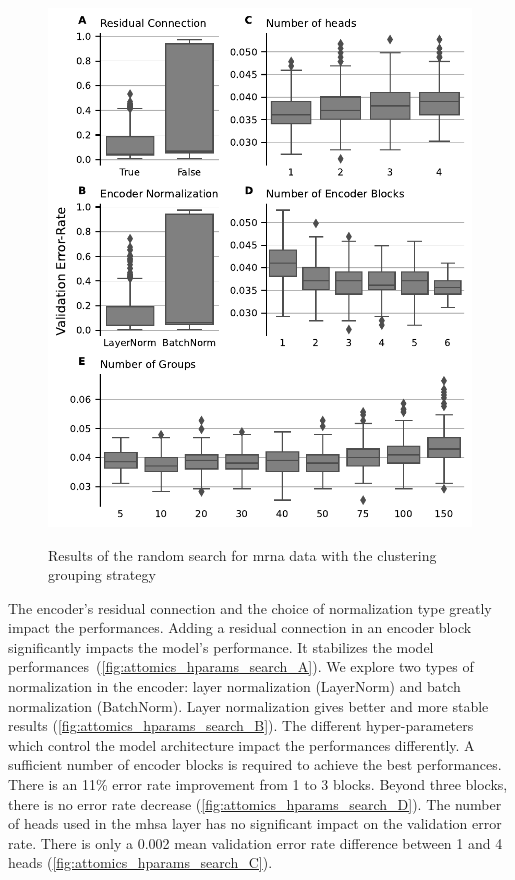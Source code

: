 \documentclass[../main.tex]{subfiles}
\begin{document}
\begin{figure}[htbp]
	\centering
	\begin{subcaptiongroup}
		\includegraphics[width=0.9\linewidth]{Beaude.168.fig.2.pdf}
		\label{fig:attomics_hparams_search_A}
		\label{fig:attomics_hparams_search_B}
		\label{fig:attomics_hparams_search_C}
		\label{fig:attomics_hparams_search_D}
		\label{fig:attomics_hparams_search_E}
	\end{subcaptiongroup}
	\caption{Results of the random search for \gls{mrna} data with the clustering grouping strategy}\label{fig:hparams_search}
\end{figure}

The encoder's residual connection and the choice of normalization type greatly impact the performances.
Adding a residual connection in an encoder block significantly impacts the model's performance.
It stabilizes the model performances~(\cref{fig:attomics_hparams_search_A}).
We explore two types of normalization in the encoder: layer normalization (LayerNorm) and batch normalization (BatchNorm).
Layer normalization gives better and more stable results (\cref{fig:attomics_hparams_search_B}).
The different hyper-parameters which control the model architecture impact the performances differently.
A sufficient number of encoder blocks is required to achieve the best performances.
There is an 11\% error rate improvement from 1 to 3 blocks.
Beyond three blocks, there is no error rate decrease (\cref{fig:attomics_hparams_search_D}).
The number of heads used in the \gls{mhsa} layer has no significant impact on the validation error rate.
There is only a 0.002 mean validation error rate difference between 1 and 4 heads (\cref{fig:attomics_hparams_search_C}).
\end{document}
